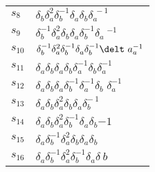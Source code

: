 \documentclass{article}
\begin{document}
\begin{center}
\begin{tabular}{ll}
$s_{8}$ & $\delta_b^{}\delta_a^{2}\delta_b^{-1}\delta_a^{}\delta_b^{}\delta_a^{\
-1}$ \\
$s_{9}$ & $\delta_b^{-1}\delta_a^{2}\delta_b^{}\delta_a^{}\delta_b^{-1}\delta_a\
^{-1}$ \\
$s_{10}$ & $\delta_b^{-1}\delta_a^{2}\delta_b^{-1}\delta_a^{}\delta_b^{-1}\delt\
a_a^{-1}$ \\
$s_{11}$ & $\delta_a^{}\delta_b^{}\delta_a^{}\delta_b^{}\delta_a^{-1}\delta_b^{\
}\delta_a^{-1}$ \\
$s_{12}$ & $\delta_a^{}\delta_b^{}\delta_a^{}\delta_b^{-1}\delta_a^{-1}\delta_b\
^{}\delta_a^{-1}$ \\
$s_{13}$ & $\delta_a^{}\delta_b^{}\delta_a^{2}\delta_b^{}\delta_a^{}\delta_b^{-\
1}$ \\
$s_{14}$ & $\delta_a^{}\delta_b^{}\delta_a^{2}\delta_b^{-1}\delta_a^{}\delta_b^\
{-1}$ \\
$s_{15}$ & $\delta_a^{}\delta_b^{-1}\delta_a^{2}\delta_b^{}\delta_a^{}\delta_b^\
{}$ \\
$s_{16}$ & $\delta_a^{}\delta_b^{-1}\delta_a^{2}\delta_b^{-1}\delta_a^{}\delta_\
b^{}$ \\
\bottomrule
\end{tabular}
\end{center}

\thispagestyle{empty}
\end{document}

